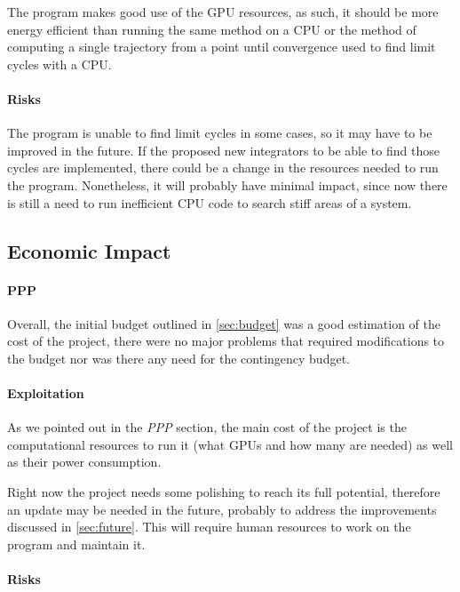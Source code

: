 The program makes good use of the GPU resources, as such, it should be more energy
efficient than running the same method on a CPU or the method of computing a single trajectory
from a point until convergence used to find limit cycles with a CPU.

\paragraph{Risks}

The program is unable to find limit cycles in some cases, so it may have to be improved
in the future. If the proposed
new integrators to be able to find those cycles are implemented, there could
be a change in the resources needed to run the program. Nonetheless, it will probably
have minimal impact, since now there is still a need to run inefficient CPU code
to search stiff areas of a system.

\subsection{Economic Impact}

\paragraph{PPP}

Overall, the initial budget outlined in \cref{sec:budget} was a good estimation of the
cost of the project, there were no major problems that required modifications to the
budget nor was there any need for the contingency budget.

\paragraph{Exploitation}

As we pointed out in the \emph{PPP} section, the main cost of the project is the
computational resources to run it (what GPUs and how many are needed) as well as their
power consumption.

Right now the project needs some polishing to reach its full potential, therefore an
update may be needed in the future, probably to address the improvements
discussed in \cref{sec:future}. This will require human resources to work on the program
and maintain it.

\paragraph{Risks}

